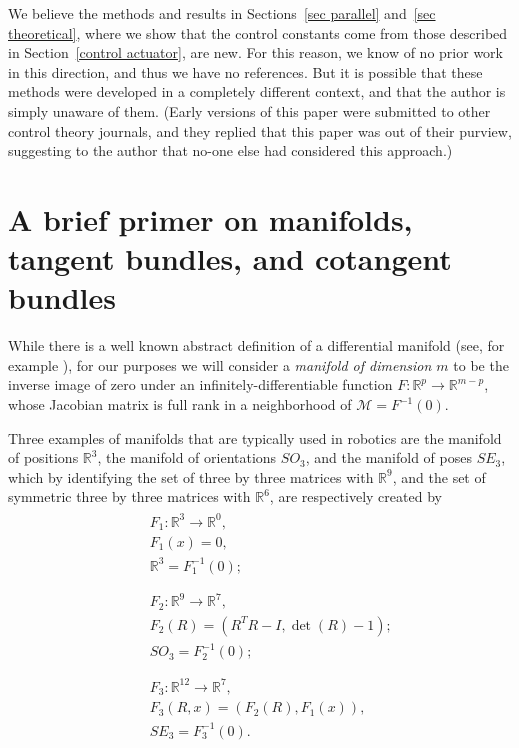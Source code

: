 \documentclass[reqno,twocolumn]{amsart}
\begin{document}
We believe the methods and results in Sections~\ref{sec parallel} and~\ref{sec theoretical}, where we show that the control constants come from those described in Section~\ref{control actuator}, are new.  For this reason, we know of no prior work in this direction, and thus we have no references.  But it is possible that these methods were developed in a completely different context, and that the author is simply unaware of them.  (Early versions of this paper were submitted to other control theory journals, and they replied that this paper was out of their purview, suggesting to the author that no-one else had considered this approach.)

\section{A brief primer on manifolds, tangent bundles, and cotangent bundles}

While there is a well known abstract definition of a differential manifold (see, for example \cite{lee}), for our purposes we will consider a \emph{manifold of dimension $m$} to be the inverse image of zero under an infinitely-differentiable function $F:\mathbb R^p \to \mathbb R^{m-p}$, whose Jacobian matrix is full rank in a neighborhood of $\mathcal M = F^{-1}(0)$.

Three examples of manifolds that are typically used in robotics are the manifold of positions $\mathbb R^3$, the manifold of orientations $SO_3$, and the manifold of poses $SE_3$, which by identifying the set of three by three matrices with $\mathbb R^9$, and the set of symmetric three by three matrices with $\mathbb R^6$, are respectively created by
\begin{align}
&\begin{aligned}
&F_1:\mathbb R^3 \to \mathbb R^0, \\ &F_1(x) = 0, \\ &\mathbb R^3 = F_1^{-1}(0); \\ &\
\end{aligned}\\
&\begin{aligned}
&F_2:\mathbb R^9 \to \mathbb R^7, \\ &F_2(R) = (R^T R - I, \det(R) - 1); \\ &SO_3 = F_2^{-1}(0); \\ &\
\end{aligned} \\
&\begin{aligned}
&F_3:\mathbb R^{12} \to \mathbb R^7, \\ &F_3(R,x) = (F_2(R), F_1(x)), \\ &SE_3 = F_3^{-1}(0).
\end{aligned}
\end{align}
\end{document}

